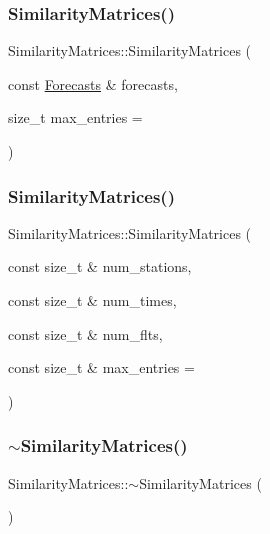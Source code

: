 \subsubsection{\texorpdfstring{Similarity\+Matrices()}{SimilarityMatrices()}\hspace{0.1cm}{\footnotesize\ttfamily [3/4]}}
{\footnotesize\ttfamily Similarity\+Matrices\+::\+Similarity\+Matrices (\begin{DoxyParamCaption}\item[{const \mbox{\hyperlink{class_forecasts}{Forecasts}} \&}]{forecasts,  }\item[{size\+\_\+t}]{max\+\_\+entries = {} }\end{DoxyParamCaption})}

\mbox{\label{class_similarity_matrices_a5ea02e3aad08277c862accea5e5eccd8}} 
\subsubsection{\texorpdfstring{Similarity\+Matrices()}{SimilarityMatrices()}\hspace{0.1cm}{\footnotesize\ttfamily [4/4]}}
{\footnotesize\ttfamily Similarity\+Matrices\+::\+Similarity\+Matrices (\begin{DoxyParamCaption}\item[{const size\+\_\+t \&}]{num\+\_\+stations,  }\item[{const size\+\_\+t \&}]{num\+\_\+times,  }\item[{const size\+\_\+t \&}]{num\+\_\+flts,  }\item[{const size\+\_\+t \&}]{max\+\_\+entries = {} }\end{DoxyParamCaption})}

\mbox{\label{class_similarity_matrices_a255b73355331573de8e038b9f1c28b6b}} 
\subsubsection{\texorpdfstring{$\sim$\+Similarity\+Matrices()}{~SimilarityMatrices()}}
{\footnotesize\ttfamily Similarity\+Matrices\+::$\sim$\+Similarity\+Matrices (\begin{DoxyParamCaption}{ }\end{DoxyParamCaption})}



